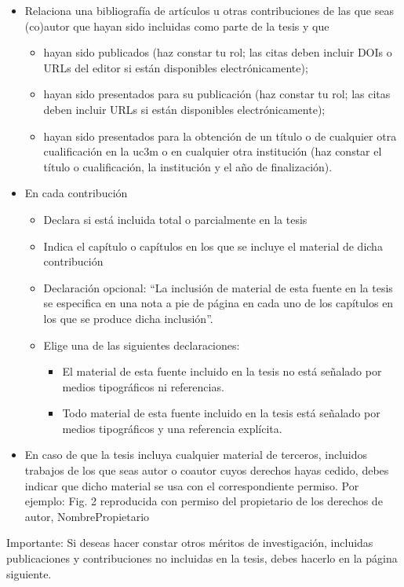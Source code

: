 \documentclass[12pt]{report} %
\begin{document}
\begin{itemize}
    \item Relaciona una bibliografía de artículos u otras contribuciones de las que seas (co)autor que hayan sido incluidas como parte de la tesis y que
    \begin{itemize}
        \item hayan sido publicados (haz constar tu rol; las citas deben incluir DOIs o URLs del editor si están disponibles electrónicamente);  
        \item hayan sido presentados para su publicación (haz constar tu rol; las citas deben incluir  URLs si están disponibles electrónicamente);
        \item hayan sido presentados para la obtención de un título o de cualquier otra cualificación en la uc3m o en cualquier otra institución (haz constar el título o cualificación, la institución y el año de finalización).
    \end{itemize}
    \item En cada contribución 
    \begin{itemize}
        \item Declara si está incluida total o parcialmente en la tesis
        \item Indica el capítulo o capítulos en los que se incluye el material de dicha contribución
        \item Declaración opcional: “La inclusión de material de esta fuente en la tesis se especifica en una nota a pie de página en cada uno de los capítulos en los que se produce dicha inclusión”.
        \item Elige una de las siguientes declaraciones:
        \begin{itemize}
            \item El material de esta fuente incluido en la tesis no está señalado por medios tipográficos ni referencias.
            \item Todo material de esta fuente incluido en la tesis está señalado por medios tipográficos y una referencia explícita.
        \end{itemize}
        \end{itemize}
    \item En caso de que la tesis incluya cualquier material de terceros, incluidos trabajos de los que seas autor o coautor cuyos derechos hayas cedido, debes indicar que dicho material se usa con el correspondiente permiso. Por ejemplo: Fig.  2 reproducida con permiso del propietario de los derechos de autor, NombrePropietario
\end{itemize}
Importante: Si deseas hacer constar otros méritos de investigación, incluidas publicaciones y contribuciones no incluidas en la tesis, debes hacerlo en la página siguiente.
\end{document}
